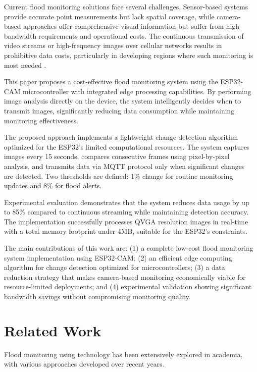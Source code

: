 \documentclass[conference]{IEEEtran}
\begin{document}
Current flood monitoring solutions face several challenges. Sensor-based systems provide accurate point measurements but lack spatial coverage, while camera-based approaches offer comprehensive visual information but suffer from high bandwidth requirements and operational costs. The continuous transmission of video streams or high-frequency images over cellular networks results in prohibitive data costs, particularly in developing regions where such monitoring is most needed \cite{domingues2024deep}.

This paper proposes a cost-effective flood monitoring system using the ESP32-CAM microcontroller with integrated edge processing capabilities. By performing image analysis directly on the device, the system intelligently decides when to transmit images, significantly reducing data consumption while maintaining monitoring effectiveness.

The proposed approach implements a lightweight change detection algorithm optimized for the ESP32's limited computational resources. The system captures images every 15 seconds, compares consecutive frames using pixel-by-pixel analysis, and transmits data via MQTT protocol only when significant changes are detected. Two thresholds are defined: 1\% change for routine monitoring updates and 8\% for flood alerts.

Experimental evaluation demonstrates that the system reduces data usage by up to 85\% compared to continuous streaming while maintaining detection accuracy. The implementation successfully processes QVGA resolution images in real-time with a total memory footprint under 4MB, suitable for the ESP32's constraints.

The main contributions of this work are: (1) a complete low-cost flood monitoring system implementation using ESP32-CAM; (2) an efficient edge computing algorithm for change detection optimized for microcontrollers; (3) a data reduction strategy that makes camera-based monitoring economically viable for resource-limited deployments; and (4) experimental validation showing significant bandwidth savings without compromising monitoring quality.

\section{Related Work}

Flood monitoring using technology has been extensively explored in academia, with various approaches developed over recent years.
\end{document}
